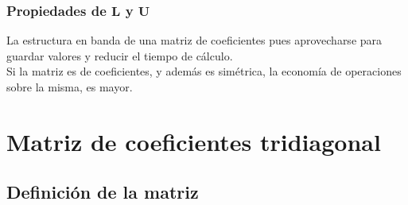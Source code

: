 \documentclass[12pt]{beamer}
\begin{document}
\begin{frame}
\frametitle{Propiedades de $\mathbf{L}$ y $\mathbf{U}$}
La estructura en banda de una matriz de coeficientes pues aprovecharse para guardar valores y reducir el tiempo de cálculo. 
\\
\medskip
\pause
Si la matriz es de coeficientes, y además es simétrica, la economía de operaciones sobre la misma, es mayor.
\end{frame}

\section{Matriz de coeficientes tridiagonal}
\subsection*{Definición de la matriz}
\end{document}
